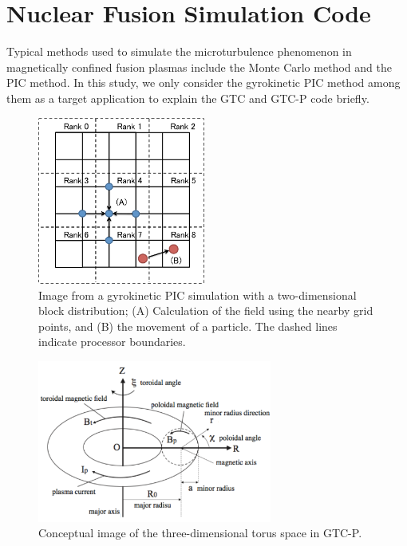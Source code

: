 
\section{Nuclear Fusion Simulation Code\label{sec2}}
Typical methods used to simulate the microturbulence phenomenon in magnetically confined fusion plasmas include the Monte Carlo method and the PIC method. In this study, we only consider the gyrokinetic PIC method among them as a target application to explain the GTC and GTC-P code briefly.

\begin{figure}[t]
\begin{center}
\includegraphics[width=5.5cm,bb=0 0 341 342]{./figure/picfig.pdf}
\caption{Image from a gyrokinetic PIC simulation with a two-dimensional block distribution; (A) Calculation of the field using the nearby grid points, and (B) the movement of a particle. The dashed lines indicate processor boundaries. }
\label{picfig}
\end{center}
\end{figure}


\begin{figure}[t]
\begin{center}
\includegraphics[width=7.7cm,bb=0 0 482 334]{./figure/torus.pdf}
\caption{Conceptual image of the three-dimensional torus space in GTC-P\cite{NUGA}.}
\label{torus}
\end{center}
\end{figure}

